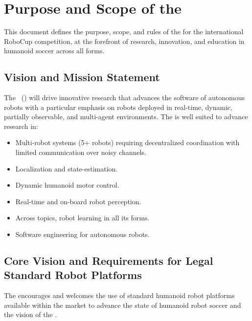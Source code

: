 \section{Purpose and Scope of the \leaguename}
\label{sec:introduction}

This document defines the purpose, scope, and rules of the \leaguename for the international RoboCup competition, at the forefront of research, innovation, and education in humanoid soccer across all forms.

\subsection{Vision and Mission Statement}
\label{sec:vision_and_mission}

The \leaguename~(\leaguenameabbr) will drive innovative research that advances the software of autonomous robots with a particular emphasis on robots deployed in real-time, dynamic, partially observable, and multi-agent environments.
The \leaguenameabbr is well suited to advance research in:
\begin{itemize}
    \item Multi-robot systems (5+ robots) requiring decentralized coordination with limited communication over noisy channels.
    \item Localization and state-estimation.
    \item Dynamic humanoid motor control.
    \item Real-time and on-board robot perception.
    \item Across topics, robot learning in all its forms.
    \item Software engineering for autonomous robots.
\end{itemize}

\subsection{Core Vision and Requirements for Legal Standard Robot Platforms}

The \leaguenameabbr encourages and welcomes the use of standard humanoid robot platforms available within the market to advance the state of humanoid robot soccer and the vision of the \leaguenameabbr.

